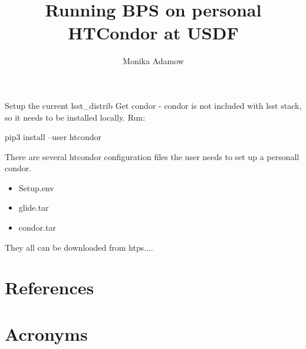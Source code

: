 \documentclass[OPS,authoryear,toc]{lsstdoc}
\title{Running BPS on personal HTCondor at USDF}
\author{%
Monika Adamow
}
\date{\vcsDate}
\begin{document}
\maketitle


Setup the current lsst_distrib
Get condor - condor is not included with lsst stack,  so it needs to be installed locally. 
Run:

 pip3 install --user htcondor
 
 There are several htcondor configuration files the user needs to set up a personall condor.
 \begin{itemize}
 \item Setup.env
 \item glide.tar
 \item condor.tar
 \end{itemize}
They all can be downloaded from htps....


\appendix
\section{References} \label{sec:bib}
\renewcommand{\refname}{} %


\section{Acronyms} \label{sec:acronyms}

\end{document}

